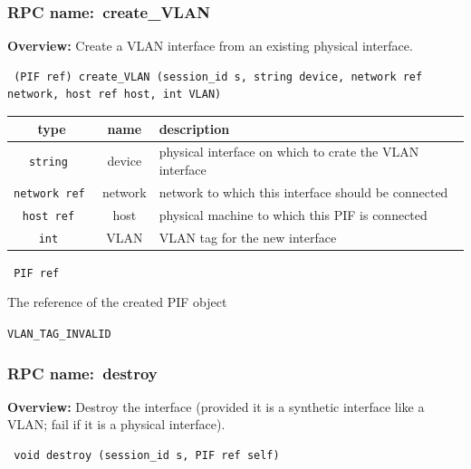 \subsubsection{RPC name:~create\_VLAN}

{\bf Overview:} 
Create a VLAN interface from an existing physical interface.

\begin{verbatim} (PIF ref) create_VLAN (session_id s, string device, network ref network, host ref host, int VLAN)\end{verbatim}



 
\vspace{0.3cm}
\begin{tabular}{|c|c|p{7cm}|}
 \hline
{\bf type} & {\bf name} & {\bf description} \\ \hline
{\tt string } & device & physical interface on which to crate the VLAN interface \\ \hline 

{\tt network ref } & network & network to which this interface should be connected \\ \hline 

{\tt host ref } & host & physical machine to which this PIF is connected \\ \hline 

{\tt int } & VLAN & VLAN tag for the new interface \\ \hline 

\end{tabular}

\vspace{0.3cm}

{\tt 
PIF ref
}


The reference of the created PIF object
\vspace{0.3cm}

 {\tt VLAN\_TAG\_INVALID}

\vspace{0.6cm}
\subsubsection{RPC name:~destroy}

{\bf Overview:} 
Destroy the interface (provided it is a synthetic interface like a VLAN;
fail if it is a physical interface).

\begin{verbatim} void destroy (session_id s, PIF ref self)\end{verbatim}


